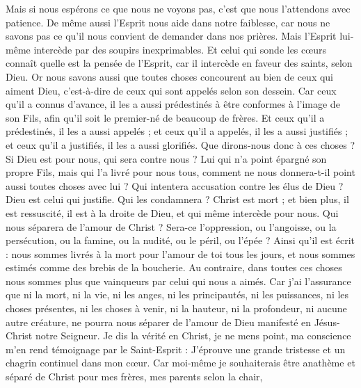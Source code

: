 \begin{multicols}{2}
Mais si nous espérons ce que nous ne voyons pas, c'est que nous l'attendons avec patience.
De même aussi l’Esprit nous aide dans notre faiblesse, car nous ne savons pas ce qu’il nous convient de demander dans nos prières. Mais l’Esprit lui-même intercède par des soupirs inexprimables.
Et celui qui sonde les cœurs connaît quelle est la pensée de l'Esprit, car il intercède en faveur des saints, selon Dieu.
Or nous savons aussi que toutes choses concourent au bien de ceux qui aiment Dieu, c'est-à-dire de ceux qui sont appelés selon son dessein.
Car ceux qu'il a connus d’avance, il les a aussi prédestinés à être conformes à l'image de son Fils, afin qu'il soit le premier-né de beaucoup de frères.
Et ceux qu'il a prédestinés, il les a aussi appelés ; et ceux qu'il a appelés, il les a aussi justifiés ; et ceux qu'il a justifiés, il les a aussi glorifiés.
Que dirons-nous donc à ces choses ? Si Dieu est pour nous, qui sera contre nous ?
Lui qui n'a point épargné son propre Fils, mais qui l'a livré pour nous tous, comment ne nous donnera-t-il point aussi toutes choses avec lui ?
Qui intentera accusation contre les élus de Dieu ? Dieu est celui qui justifie.
Qui les condamnera ? Christ est mort ; et bien plus, il est ressuscité, il est à la droite de Dieu, et qui même intercède pour nous.
Qui nous séparera de l'amour de Christ ? Sera-ce l'oppression, ou l'angoisse, ou la persécution, ou la famine, ou la nudité, ou le péril, ou l'épée ?
Ainsi qu’il est écrit : nous sommes livrés à la mort pour l’amour de toi tous les jours, et nous sommes estimés comme des brebis de la boucherie.
Au contraire, dans toutes ces choses nous sommes plus que vainqueurs par celui qui nous a aimés.
Car j’ai l’assurance que ni la mort, ni la vie, ni les anges, ni les principautés, ni les puissances, ni les choses présentes, ni les choses à venir,
ni la hauteur, ni la profondeur, ni aucune autre créature, ne pourra nous séparer de l'amour de Dieu manifesté en Jésus-Christ notre Seigneur.
\VerseOne{}Je dis la vérité en Christ, je ne mens point, ma conscience m’en rend témoignage par le Saint-Esprit :
J’éprouve une grande tristesse et un chagrin continuel dans mon cœur.
Car moi-même je souhaiterais être anathème et séparé de Christ pour mes frères, mes parents selon la chair,

\end{multicols}
